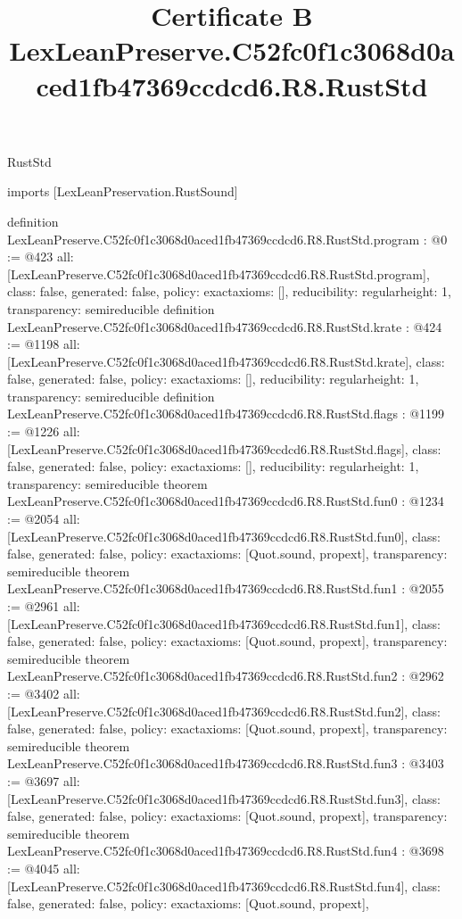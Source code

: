 \begin{lexlean}{RustStd}
\title{Certificate B LexLeanPreserve.C52fc0f1c3068d0aced1fb47369ccdcd6.R8.RustStd}
\begin{coremodule}
imports [LexLeanPreservation.RustSound]

definition LexLeanPreserve.C52fc0f1c3068d0aced1fb47369ccdcd6.R8.RustStd.program : @0 := @423 {
  all: [LexLeanPreserve.C52fc0f1c3068d0aced1fb47369ccdcd6.R8.RustStd.program],
  class: false,
  generated: false,
  policy: exact{axioms: []},
  reducibility: regular{height: 1},
  transparency: semireducible
}
definition LexLeanPreserve.C52fc0f1c3068d0aced1fb47369ccdcd6.R8.RustStd.krate : @424 := @1198 {
  all: [LexLeanPreserve.C52fc0f1c3068d0aced1fb47369ccdcd6.R8.RustStd.krate],
  class: false,
  generated: false,
  policy: exact{axioms: []},
  reducibility: regular{height: 1},
  transparency: semireducible
}
definition LexLeanPreserve.C52fc0f1c3068d0aced1fb47369ccdcd6.R8.RustStd.flags : @1199 := @1226 {
  all: [LexLeanPreserve.C52fc0f1c3068d0aced1fb47369ccdcd6.R8.RustStd.flags],
  class: false,
  generated: false,
  policy: exact{axioms: []},
  reducibility: regular{height: 1},
  transparency: semireducible
}
theorem LexLeanPreserve.C52fc0f1c3068d0aced1fb47369ccdcd6.R8.RustStd.fun0 : @1234 := @2054 {
  all: [LexLeanPreserve.C52fc0f1c3068d0aced1fb47369ccdcd6.R8.RustStd.fun0],
  class: false,
  generated: false,
  policy: exact{axioms: [Quot.sound, propext]},
  transparency: semireducible
}
theorem LexLeanPreserve.C52fc0f1c3068d0aced1fb47369ccdcd6.R8.RustStd.fun1 : @2055 := @2961 {
  all: [LexLeanPreserve.C52fc0f1c3068d0aced1fb47369ccdcd6.R8.RustStd.fun1],
  class: false,
  generated: false,
  policy: exact{axioms: [Quot.sound, propext]},
  transparency: semireducible
}
theorem LexLeanPreserve.C52fc0f1c3068d0aced1fb47369ccdcd6.R8.RustStd.fun2 : @2962 := @3402 {
  all: [LexLeanPreserve.C52fc0f1c3068d0aced1fb47369ccdcd6.R8.RustStd.fun2],
  class: false,
  generated: false,
  policy: exact{axioms: [Quot.sound, propext]},
  transparency: semireducible
}
theorem LexLeanPreserve.C52fc0f1c3068d0aced1fb47369ccdcd6.R8.RustStd.fun3 : @3403 := @3697 {
  all: [LexLeanPreserve.C52fc0f1c3068d0aced1fb47369ccdcd6.R8.RustStd.fun3],
  class: false,
  generated: false,
  policy: exact{axioms: [Quot.sound, propext]},
  transparency: semireducible
}
theorem LexLeanPreserve.C52fc0f1c3068d0aced1fb47369ccdcd6.R8.RustStd.fun4 : @3698 := @4045 {
  all: [LexLeanPreserve.C52fc0f1c3068d0aced1fb47369ccdcd6.R8.RustStd.fun4],
  class: false,
  generated: false,
  policy: exact{axioms: [Quot.sound, propext]},
}
\end{coremodule}
\end{lexlean}
